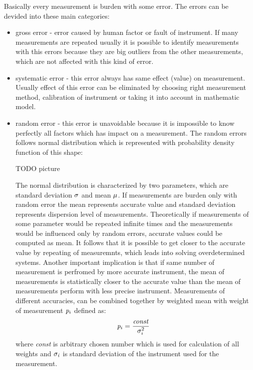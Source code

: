 \documentclass[a4paper,12pt]{article}
\newcommand{\escal}[1]{
{\it #1}
}
\begin{document}
Basically every measurement is burden with some error. The errors can be devided into these main categories:  
\begin{itemize}
\item gross error - error caused by human factor or fault of instrument. If many measurements are repeated
usually it is possible to identify measurements with this errors because they are big outliers from the other measurements, which are not affected with this 
kind of error.
\item systematic error - this error always has same effect (value) on measurement.  Usually effect of this error can be 
eliminated by choosing right measurement method, calibration of instrument or taking it into account in  mathematic model.
\item random error - this error is unavoidable because it is impossible to know perfectly all factors which has impact 
on a measurement. The random errors follows normal distribution which is represented with probability density function of this shape:

TODO picture


The normal distribution is characterized by two parameters, which are standard deviation 
$\escal{\sigma}$ and mean $\escal{\mu}$. 
If measurements are burden only with random error the mean represents accurate value and standard deviation represents 
dispersion level of measurements. 
Theoretically  if measurements of some parameter would be repeated infinite times and the measurements would be influenced only by random errors,
accurate values could be computed as mean.
It follows that it is possible to get closer to the accurate value by repeating of measuremnts, which 
leads into solving overdetermined systems. Another important implication is that if same number of measurement is perfromed by more accurate 
instrument, the mean of measurements is statistically closer to the accurate value than the mean of measurements perform with less precise instrument.
Measurements of different accuracies, can be combined together by weighted mean
with weight of measurement $\escal{p}_{i}$ defined as:
\begin{equation}
\label{eq:wmean}
\escal{p}_{i} = \frac{\escal{const}}{\escal{\sigma}_{i}^{2}}
\end{equation} 
where \escal{const} is arbitrary chosen number which is used for calculation of all weights 
and $\escal{\sigma_{i}}$ is standard deviation of the instrument used for the measurement.
\end{itemize}
\end{document}
